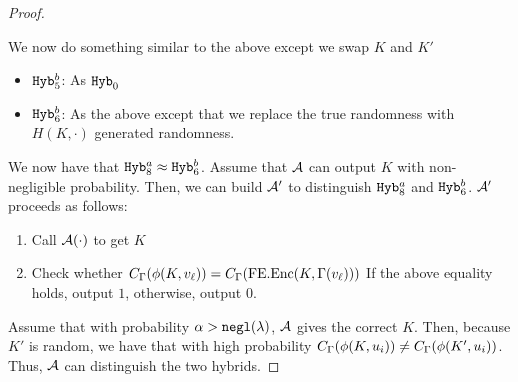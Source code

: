 \begin{lemma}
\begin{proof}
\begin{itemize}
	\end{itemize}
	We now do something similar to the above except we swap $K$ and $K'$
	\begin{itemize}
		\item $\texttt{Hyb}_5^b$: As $\texttt{Hyb}_0$
		\item $\texttt{Hyb}_6^b$: As the above except that we replace the true randomness with $H(K, \cdot)$ generated randomness.
	\end{itemize}
	We now have that $\texttt{Hyb}_8^a \approx \texttt{Hyb}_6^b$.
	Assume that $\mathcal{A}$ can output $K$ with non-negligible probability. Then, we can build $\mathcal{A}'$ to distinguish
	$\texttt{Hyb}_8^a$ and $\texttt{Hyb}_6^b$.
	$\mathcal{A}'$ proceeds as follows:
	\begin{enumerate}
		\item Call $\mathcal{A}(\cdot)$ to get $K$
		\item Check whether $C_\Gamma(\phi(K, v_\ell)) = C_\Gamma(\text{FE.Enc}(K, \Gamma(v_\ell)))$ 
		If the above equality holds, output $1$, otherwise, output $0$.
	\end{enumerate}
	Assume that with probability $\alpha > \texttt{negl}(\lambda)$, $\mathcal{A}$ gives the correct $K$.
	Then, because $K'$ is random, we have that with high probability $C_\Gamma(\phi(K, u_i)) \neq C_\Gamma(\phi(K', u_i))$.
	Thus, $\mathcal{A}$ can distinguish the two hybrids.
	\end{proof}
\end{lemma}

